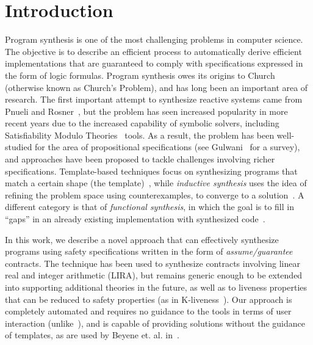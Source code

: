 
\section{Introduction}

Program synthesis is one of the most challenging problems in computer science. The objective is to describe an efficient process to automatically derive efficient implementations that are guaranteed to comply with specifications expressed in the form of logic formulas. Program synthesis owes its origins to Church~\cite{church1962logic} (otherwise known as Church's Problem), and has long been an important area of research.
%
%
The first important attempt to synthesize reactive systems came from Pnueli and Rosner~\cite{pnueli1989synthesis}, but the problem has seen increased popularity in more recent years due to the increased capability of symbolic solvers, including Satisfiability Modulo Theories~\cite{BarFT-SMTLIB} tools. As a result, the problem has been well-studied for the area of propositional specifications (see Gulwani~\cite{gulwani2010dimensions} for a survey), and approaches have been proposed to tackle challenges involving richer specifications. Template-based techniques focus on synthesizing programs that
match a certain shape (the template)~\cite{srivastava2013template}, while {\em inductive synthesis} uses the idea of refining the problem space using counterexamples, to converge to a solution~\cite{flener2001inductive}. A different category is that of \textit{functional synthesis}, in which the goal is to fill in ``gaps'' in an already existing implementation with synthesized code~\cite{kuncak2013functional}.

In this work, we describe a novel approach that can effectively synthesize
programs using safety specifications written in the form of {\em
assume/guarantee} contracts. The technique has been used to synthesize contracts involving linear real and integer arithmetic (LIRA),
but remains generic enough to be extended into supporting additional theories 
in the future, as well as to liveness properties that can be reduced to safety properties  (as in K-liveness~\cite{claessen2012liveness}).  Our approach is completely automated and requires no guidance to the tools in terms of user interaction (unlike~\cite{ryzhyk2014user,ryzhyk2016developing}), and is capable of providing solutions without the guidance of templates, as are used by Beyene et. al.
in~\cite{beyene2014constraint}.

